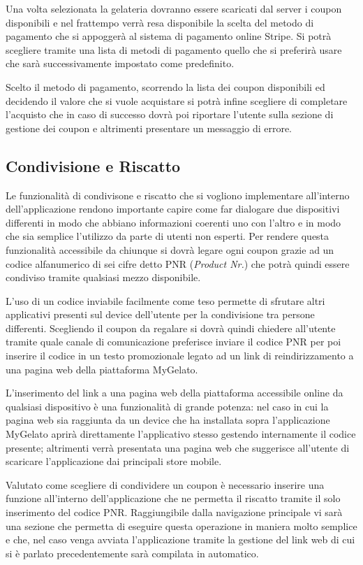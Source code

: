 Una volta selezionata la gelateria dovranno essere scaricati dal server
i coupon disponibili e nel frattempo verrà resa disponibile la scelta
del metodo di pagamento che si appoggerà al sistema di pagamento online
Stripe. Si potrà scegliere tramite una lista di metodi di pagamento
quello che si preferirà usare che sarà successivamente impostato come
predefinito.

Scelto il metodo di pagamento, scorrendo la lista dei coupon disponibili
ed decidendo il valore che si vuole acquistare si potrà infine scegliere
di completare l'acquisto che in caso di successo dovrà poi riportare
l'utente sulla sezione di gestione dei coupon e altrimenti presentare
un messaggio di errore.

\subsection{Condivisione e Riscatto}

Le funzionalità di condivisone e riscatto che si vogliono implementare
all'interno dell'applicazione rendono importante capire come far dialogare
due dispositivi differenti in modo che abbiano informazioni coerenti
uno con l'altro e in modo che sia semplice l'utilizzo da parte di
utenti non esperti. Per rendere questa funzionalità accessibile da
chiunque si dovrà legare ogni coupon grazie ad un codice alfanumerico
di sei cifre detto PNR (\emph{Product Nr.}) che potrà quindi essere
condiviso tramite qualsiasi mezzo disponibile.\bigskip{}

L'uso di un codice inviabile facilmente come teso permette di sfrutare
altri applicativi presenti sul device dell'utente per la condivisione
tra persone differenti. Scegliendo il coupon da regalare si dovrà
quindi chiedere all'utente tramite quale canale di comunicazione preferisce
inviare il codice PNR per poi inserire il codice in un testo promozionale
legato ad un link di reindirizzamento a una pagina web della piattaforma
MyGelato.

L'inserimento del link a una pagina web della piattaforma accessibile
online da qualsiasi dispositivo è una funzionalità di grande potenza:
nel caso in cui la pagina web sia raggiunta da un device che ha installata
sopra l'applicazione MyGelato aprirà direttamente l'applicativo stesso
gestendo internamente il codice presente; altrimenti verrà presentata
una pagina web che suggerisce all'utente di scaricare l'applicazione
dai principali store mobile.\bigskip{}

Valutato come scegliere di condividere un coupon è necessario inserire
una funzione all'interno dell'applicazione che ne permetta il riscatto
tramite il solo inserimento del codice PNR. Raggiungibile dalla navigazione
principale vi sarà una sezione che permetta di eseguire questa operazione
in maniera molto semplice e che, nel caso venga avviata l'applicazione
tramite la gestione del link web di cui si è parlato precedentemente
sarà compilata in automatico.

